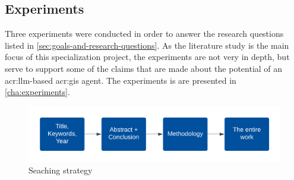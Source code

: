 \subsection{Experiments}\label{subsec:research-method-experiments}

Three experiments were conducted in order to answer the research questions listed in \autoref{sec:goals-and-research-questions}. As the literature study is the main focus of this specialization project, the experiments are not very in depth, but serve to support some of the claims that are made about the potential of an \acrshort{acr:llm}-based \acrshort{acr:gis} agent. The experiments is are presented in \autoref{cha:experiments}.

\begin{figure}
    \centering
    \includegraphics[width=\textwidth]{../figs/Literature study.png}
    \caption{Seaching strategy}
    \label{fig:searching-strategy}
\end{figure}




